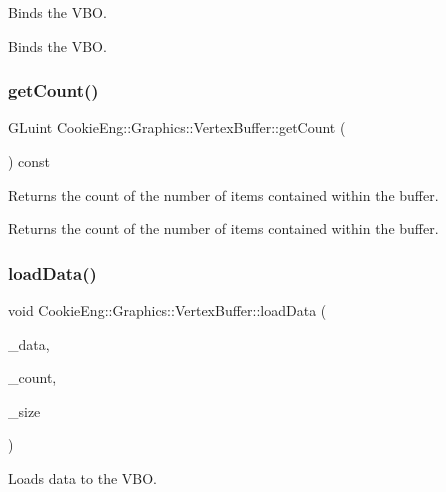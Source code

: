Binds the V\+BO. 

Binds the V\+BO. \mbox{\label{class_cookie_eng_1_1_graphics_1_1_vertex_buffer_a667b81c15525bd5f76d979e0c8b02be0}} 
\subsubsection{\texorpdfstring{get\+Count()}{getCount()}}
{\footnotesize\ttfamily G\+Luint Cookie\+Eng\+::\+Graphics\+::\+Vertex\+Buffer\+::get\+Count (\begin{DoxyParamCaption}{ }\end{DoxyParamCaption}) const\hspace{0.3cm}{\ttfamily [inline]}}



Returns the count of the number of items contained within the buffer. 

Returns the count of the number of items contained within the buffer. \mbox{\label{class_cookie_eng_1_1_graphics_1_1_vertex_buffer_ac3db6a2571101d1836fab492971c75fa}} 
\subsubsection{\texorpdfstring{load\+Data()}{loadData()}}
{\footnotesize\ttfamily void Cookie\+Eng\+::\+Graphics\+::\+Vertex\+Buffer\+::load\+Data (\begin{DoxyParamCaption}\item[{const void $\ast$}]{\+\_\+data,  }\item[{G\+Luint}]{\+\_\+count,  }\item[{G\+Luint}]{\+\_\+size }\end{DoxyParamCaption})}



Loads data to the V\+BO. 


